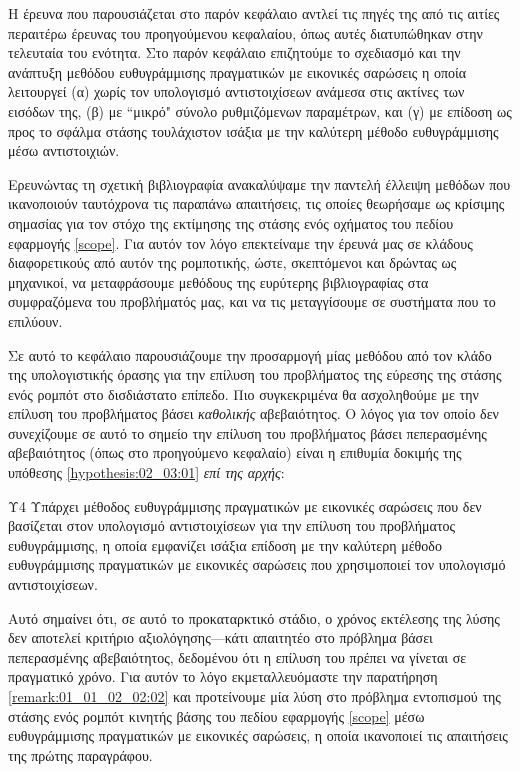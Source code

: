 Η έρευνα που παρουσιάζεται στο παρόν κεφάλαιο αντλεί τις πηγές της από τις
αιτίες περαιτέρω έρευνας του προηγούμενου κεφαλαίου, όπως αυτές διατυπώθηκαν
στην τελευταία του ενότητα. Στο παρόν κεφάλαιο επιζητούμε το σχεδιασμό και
την ανάπτυξη μεθόδου ευθυγράμμισης πραγματικών με εικονικές σαρώσεις η οποία
λειτουργεί (α) χωρίς τον υπολογισμό αντιστοιχίσεων ανάμεσα στις ακτίνες των
εισόδων της, (β) με ``μικρό" σύνολο ρυθμιζόμενων παραμέτρων, και (γ) με
επίδοση ως προς το σφάλμα στάσης τουλάχιστον ισάξια με την καλύτερη μέθοδο
ευθυγράμμισης μέσω αντιστοιχιών.

Ερευνώντας τη σχετική βιβλιογραφία ανακαλύψαμε την παντελή έλλειψη μεθόδων που
ικανοποιούν ταυτόχρονα τις παραπάνω απαιτήσεις, τις οποίες θεωρήσαμε ως
κρίσιμης σημασίας για τον στόχο της εκτίμησης της στάσης ενός οχήματος του
πεδίου εφαρμογής \ref{scope}. Για αυτόν τον λόγο επεκτείναμε την έρευνά μας σε
κλάδους διαφορετικούς από αυτόν της ρομποτικής, ώστε, σκεπτόμενοι και δρώντας
ως μηχανικοί, να μεταφράσουμε μεθόδους της ευρύτερης βιβλιογραφίας στα
συμφραζόμενα του προβλήματός μας, και να τις μεταγγίσουμε σε συστήματα που το
επιλύουν.

Σε αυτό το κεφάλαιο παρουσιάζουμε την προσαρμογή μίας μεθόδου από τον κλάδο της
υπολογιστικής όρασης για την επίλυση του προβλήματος της εύρεσης της στάσης
ενός ρομπότ στο δισδιάστατο επίπεδο. Πιο συγκεκριμένα θα ασχοληθούμε με την
επίλυση του προβλήματος βάσει \textit{καθολικής} αβεβαιότητος. Ο λόγος για τον
οποίο δεν συνεχίζουμε σε αυτό το σημείο την επίλυση του προβλήματος βάσει
πεπερασμένης αβεβαιότητος (όπως στο προηγούμενο κεφαλαίο) είναι η επιθυμία
δοκιμής της υπόθεσης \ref{hypothesis:02_03:01} \textit{επί της αρχής}:

\begin{customhypothesis}{Υ4}
\label{hypothesis:02_03:01}
  Υπάρχει μέθοδος ευθυγράμμισης πραγματικών με εικονικές σαρώσεις που δεν
  βασίζεται στον υπολογισμό αντιστοιχίσεων για την επίλυση του προβλήματος
  ευθυγράμμισης, η οποία εμφανίζει ισάξια επίδοση με την καλύτερη μέθοδο
  ευθυγράμμισης πραγματικών με εικονικές σαρώσεις που χρησιμοποιεί τον
  υπολογισμό αντιστοιχίσεων.
\end{customhypothesis}

Αυτό σημαίνει ότι, σε αυτό το προκαταρκτικό στάδιο, ο χρόνος εκτέλεσης της
λύσης δεν αποτελεί κριτήριο αξιολόγησης---κάτι απαιτητέο στο πρόβλημα βάσει
πεπερασμένης αβεβαιότητος, δεδομένου ότι η επίλυση του πρέπει να γίνεται σε
πραγματικό χρόνο. Για αυτόν το λόγο εκμεταλλευόμαστε την παρατήρηση
\ref{remark:01_01_02_02:02} και προτείνουμε μία λύση στο πρόβλημα εντοπισμού
της στάσης ενός ρομπότ κινητής βάσης του πεδίου εφαρμογής \ref{scope} μέσω
ευθυγράμμισης πραγματικών με εικονικές σαρώσεις, η οποία ικανοποιεί τις
απαιτήσεις της πρώτης παραγράφου.

